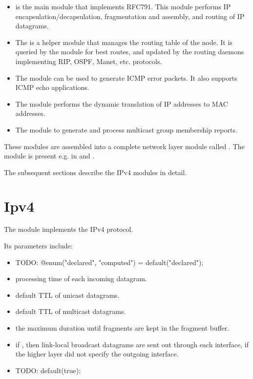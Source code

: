 \begin{itemize}
  \item {} is the main module that implements RFC791. This
        module performs IP encapsulation/decapsulation, fragmentation
        and assembly, and routing of IP datagrams.
  \item The  is a helper module that manages the routing
        table of the node. It is queried by the  module
        for best routes, and updated by the routing daemons implementing
        RIP, OSPF, Manet, etc. protocols.
  \item The  module can be used to generate ICMP error packets. It also
        supports ICMP echo applications.
  \item The  module performs the dynamic translation of IP addresses
        to MAC addresses.
  \item The  module to generate and process multicast group
        membership reports.
\end{itemize}

These modules are assembled into a complete network layer module called
. The  module is present
e.g. in  and .

The subsequent sections describe the IPv4 modules in detail.

\section{Ipv4}

The  module implements the IPv4 protocol.

Its parameters include:

\begin{itemize}
  \item {} TODO: @enum("declared", "computed") = default("declared");
  \item {} processing time of each incoming datagram.
  \item {} default TTL of unicast datagrams.
  \item {} default TTL of multicast datagrams.
  \item {} the maximum duration until fragments are kept
          in the fragment buffer.
  \item {} if , then link-local broadcast
          datagrams are sent out through each interface, if the higher
          layer did not specify the outgoing interface.
  \item {} TODO: default(true);
\end{itemize}

